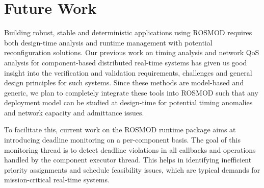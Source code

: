 \section{Future Work}
\label{sec:Future_Work}

Building robust, stable and deterministic applications using ROSMOD requires both design-time analysis and runtime management with potential reconfiguration solutions. Our previous work on timing analysis \cite{MoDeVVa}\cite{SEUS} and network QoS analysis \cite{ISIS_F6_CYPHY:14} for component-based distributed real-time systems has given us good insight into the verification and validation requirements, challenges and general design principles for such systems. Since these methods are model-based and generic, we plan to completely integrate these tools into ROSMOD such that any deployment model can be studied at design-time for potential timing anomalies and network capacity and admittance issues. 

To facilitate this, current work on the ROSMOD runtime package aims at introducing deadline monitoring on a per-component basis. The goal of this monitoring thread is to detect deadline violations in all callbacks and operations handled by the component executor thread. This helps in identifying inefficient priority assignments and schedule feasibility issues, which are typical demands for mission-critical real-time systems.

